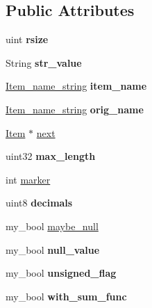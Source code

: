 \subsection*{Public Attributes}
\begin{DoxyCompactItemize}
\item 
\mbox{\label{classItem_a0f4da124355876c1c871c190a62d76a6}} 
uint {\bfseries rsize}
\item 
\mbox{\label{classItem_a0624277d59e4437075c246386c43d192}} 
String {\bfseries str\+\_\+value}
\item 
\mbox{\label{classItem_a5d6671d423ea099d218147d62475dc42}} 
\mbox{\hyperlink{classItem__name__string}{Item\+\_\+name\+\_\+string}} {\bfseries item\+\_\+name}
\item 
\mbox{\label{classItem_aaa596db59f6b0b1f78a3a86abcc44c67}} 
\mbox{\hyperlink{classItem__name__string}{Item\+\_\+name\+\_\+string}} {\bfseries orig\+\_\+name}
\item 
\mbox{\hyperlink{classItem}{Item}} $\ast$ \mbox{\hyperlink{classItem_af41ed24b86b2126cf7eacc591a863f47}{next}}
\item 
\mbox{\label{classItem_ae7f55853c995853bfe9c1dc39e4aff62}} 
uint32 {\bfseries max\+\_\+length}
\item 
int \mbox{\hyperlink{classItem_afebd72a3075897b31b17ead8dd1d10eb}{marker}}
\item 
\mbox{\label{classItem_ac2171994f02baa59dfb36c176cbe6724}} 
uint8 {\bfseries decimals}
\item 
my\+\_\+bool \mbox{\hyperlink{classItem_a4c62081a1b4986d26cf265143f403e4b}{maybe\+\_\+null}}
\item 
\mbox{\label{classItem_a429f008ae0acdcdccac02674722503b5}} 
my\+\_\+bool {\bfseries null\+\_\+value}
\item 
\mbox{\label{classItem_a4f54eded4efc2774f573b3de72a1f97c}} 
my\+\_\+bool {\bfseries unsigned\+\_\+flag}
\item 
\mbox{\label{classItem_a29f202de9231b26722d2d300c3042872}} 
my\+\_\+bool {\bfseries with\+\_\+sum\+\_\+func}

\end{DoxyCompactItemize}
